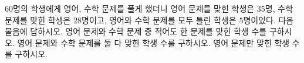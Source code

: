$60$명의 학생에게 영어, 수학 문제를 풀게 했더니 영어 문제를 맞힌 학생은 $35$명, 수학 문제를 맞힌 학생은 $28$명이고, 영어와 수학 문제를 모두 틀린 학생은 $5$명이었다. 다음 물음에 답하시오.
 영어 문제와 수학 문제 중 적어도 한 문제를 맞힌 학생 수를 구하시오.
 영어 문제와 수학 문제를 둘 다 맞힌 학생 수를 구하시오.
 영어 문제만 맞힌 학생 수를 구하시오.
